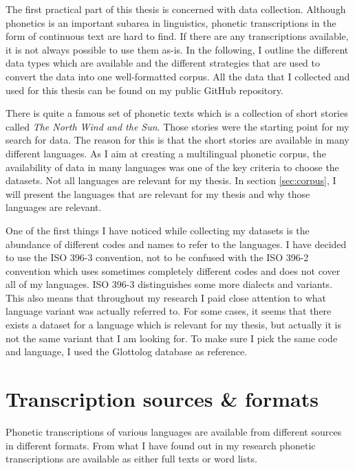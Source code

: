 \label{chap:data_collection}
The first practical part of this thesis is concerned with data collection. Although phonetics is an important subarea in linguistics, phonetic transcriptions in the form of continuous text are hard to find. If there are any transcriptions available, it is not always possible to use them as-is. In the following, I outline the different data types which are available and the different strategies that are used to convert the data into one well-formatted corpus. All the data that I collected and used for this thesis can be found on my public GitHub repository. 

There is quite a famous set of phonetic texts which is a collection of short stories called \textit{The North Wind and the Sun}. Those stories were the starting point for my search for data. The reason for this is that the short stories are available in many different languages. As I aim at creating a multilingual phonetic corpus, the availability of data in many languages was one of the key criteria to choose the datasets. Not all languages are relevant for my thesis. In section \ref{sec:corpus}, I will present the languages that are relevant for my thesis and why those languages are relevant.

One of the first things I have noticed while collecting my datasets is the abundance of different codes and names to refer to the languages. I have decided to use the ISO 396-3 convention, not to be confused with the ISO 396-2 convention which uses sometimes completely different codes and does not cover all of my languages. ISO 396-3 distinguishes some more dialects and variants. This also means that throughout my research I paid close attention to what language variant was actually referred to. For some cases, it seems that there exists a dataset for a language which is relevant for my thesis, but actually it is not the same variant that I am looking for. To make sure I pick the same code and language, I used the Glottolog database as reference.


\section{Transcription sources \& formats}
Phonetic transcriptions of various languages are available from different sources in different formats. From what I have found out in my research phonetic transcriptions are available as either full texts or word lists.

